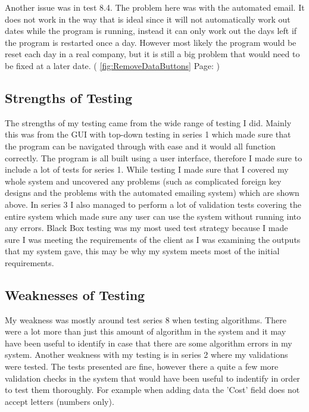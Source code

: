 \par Another issue was in test 8.4. The problem here was with the automated email. It does not work in the way that is ideal since it will not automatically work out dates while the program is running, instead it can only work out the days left if the program is restarted once a day. However most likely the program would be reset each day in a real company, but it is still a big problem that would need to be fixed at a later date. ( \ref{fig:RemoveDataButtons} Page: \pageref{fig:RemoveDataButtons})

\subsection{Strengths of Testing}

The strengths of my testing came from the wide range of testing I did. Mainly this was from the GUI with top-down testing in series 1 which made sure that the program can be navigated through with ease and it would all function correctly. The program is all built using a user interface, therefore I made sure to include a lot of tests for series 1. While testing I made sure that I covered my whole system and uncovered any problems (such as complicated foreign key designs and the problems with the automated emailing system) which are shown above. In series 3 I also managed to perform a lot of validation tests covering the entire system which made sure any user can use the system without running into any errors. Black Box testing was my most used test strategy because I made sure I was meeting the requirements of the client as I was examining the outputs that my system gave, this may be why my system meets most of the initial requirements.

\subsection{Weaknesses of Testing}

My weakness was mostly around test series 8 when testing algorithms. There were a lot more than just this amount of algorithm in the system and it may have been useful to identify in case that there are some algorithm errors in my system. Another weakness with my testing is in series 2 where my validations were tested. The tests presented are fine, however there a quite a few more validation checks in the system that would have been useful to indentify in order to test them thoroughly. For example when adding data the 'Cost' field does not accept letters (numbers only). 

